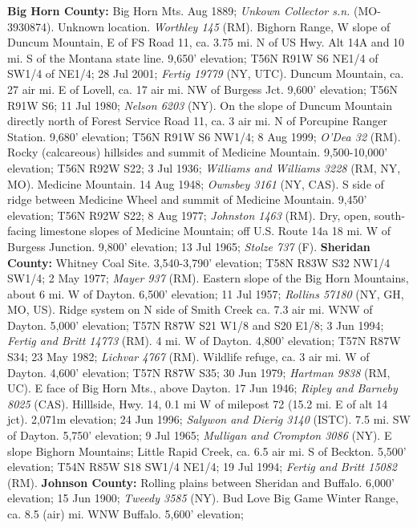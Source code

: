   \textbf{Big Horn County:}
Big Horn Mts. Aug 1889; \textit{Unkown Collector s.n.} (MO-3930874).
Unknown location. \textit{Worthley 145} (RM).
Bighorn Range, W slope of Duncum Mountain, E of FS Road 11, ca. 3.75 mi. N of
US Hwy. Alt 14A and 10 mi. S of the Montana state line. 9,650' elevation;
T56N R91W S6 NE1/4 of SW1/4 of NE1/4; 28 Jul 2001;
\textit{Fertig 19779} (NY, UTC).
Duncum Mountain, ca. 27 air mi. E of Lovell, ca. 17 air mi. NW of Burgess Jct.
9,600' elevation; T56N R91W S6; 11 Jul 1980; \textit{Nelson 6203} (NY).
On the slope of Duncum Mountain directly north of Forest Service Road 11, ca. 3
air mi. N of Porcupine Ranger Station. 9,680' elevation; T56N R91W S6 NW1/4;
8 Aug 1999; \textit{O'Dea 32} (RM).
Rocky (calcareous) hillsides and summit of Medicine Mountain.
9,500-10,000' elevation; T56N R92W S22; 3 Jul 1936;
\textit{Williams and Williams 3228} (RM, NY, MO).
Medicine Mountain. 14 Aug 1948; \textit{Ownsbey 3161} (NY, CAS).
S side of ridge between Medicine Wheel and summit of Medicine Mountain.
9,450' elevation; T56N R92W S22; 8 Aug 1977; \textit{Johnston 1463} (RM).
Dry, open, south-facing limestone slopes of Medicine Mountain; off U.S. Route
14a 18 mi. W of Burgess Junction. 9,800' elevation; 13 Jul 1965;
\textit{Stolze 737} (F).
  \textbf{Sheridan County:}
Whitney Coal Site. 3,540-3,790' elevation; T58N R83W S32 NW1/4 SW1/4;
2 May 1977; \textit{Mayer 937} (RM).
Eastern slope of the Big Horn Mountains, about 6 mi. W of Dayton.
6,500' elevation; 11 Jul 1957; \textit{Rollins 57180} (NY, GH, MO, US).
Ridge system on N side of Smith Creek ca. 7.3 air mi. WNW of Dayton.
5,000' elevation; T57N R87W S21 W1/8 and S20 E1/8; 3 Jun 1994;
\textit{Fertig and Britt 14773} (RM).
4 mi. W of Dayton. 4,800' elevation; T57N R87W S34; 23 May 1982;
\textit{Lichvar 4767} (RM).
Wildlife refuge, ca. 3 air mi. W of Dayton. 4,600' elevation; T57N R87W S35;
30 Jun 1979; \textit{Hartman 9838} (RM, UC).
E face of Big Horn Mts., above Dayton. 17 Jun 1946;
\textit{Ripley and Barneby 8025} (CAS).
Hilllside, Hwy. 14, 0.1 mi W of milepost 72 (15.2 mi. E of alt 14 jct).
2,071m elevation; 24 Jun 1996; \textit{Salywon and Dierig 3140} (ISTC).
7.5 mi. SW of Dayton. 5,750' elevation; 9 Jul 1965;
\textit{Mulligan and Crompton 3086} (NY).
E slope Bighorn Mountains; Little Rapid Creek, ca. 6.5 air mi. S of Beckton.
5,500' elevation; T54N R85W S18 SW1/4 NE1/4; 19 Jul 1994;
\textit{Fertig and Britt 15082} (RM).
  \textbf{Johnson County:}
Rolling plains between Sheridan and Buffalo. 6,000' elevation; 15 Jun 1900;
\textit{Tweedy 3585} (NY).
Bud Love Big Game Winter Range, ca. 8.5 (air) mi. WNW Buffalo. 5,600' elevation;
